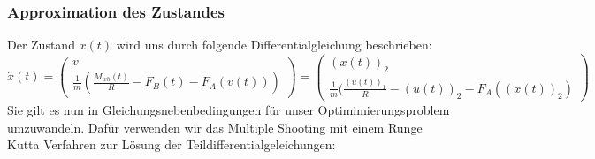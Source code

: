 \documentclass[12pt,a4paper]{article}
\theoremstyle{definition}
\theoremstyle{plain}
\begin{document}
	\subsubsection{Approximation des Zustandes}
	Der Zustand $x(t)$ wird uns durch folgende Differentialgleichung beschrieben:
	\begin{equation*}
	\dot{x}(t)=\begin{pmatrix}
	v \\
	\frac{1}{m}(\frac{M_{wh}(t)}{R}-F_{B}(t)-F_{A}(v(t)))\end{pmatrix}
	=\begin{pmatrix} (x(t))_{2}\\ \frac{1}{m}(\frac{(u(t))_{1}}{R}-(u(t))_{2}-F_{A}((x(t))_{2})
	\end{pmatrix}
	\end{equation*}
	Sie gilt es nun in Gleichungsnebenbedingungen für unser Optimimierungsproblem umzuwandeln. Dafür verwenden wir das Multiple Shooting mit einem Runge Kutta Verfahren zur Lösung der Teildifferentialgeleichungen:
\end{document}
